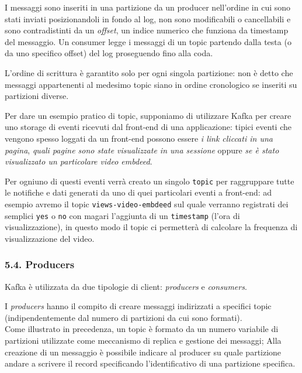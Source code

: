 \documentclass[]{article}
\begin{document}
I messaggi sono inseriti in una partizione da un producer nell'ordine in
cui sono stati inviati posizionandoli in fondo al log, non sono
modificabili o cancellabili e sono contradistinti da un \emph{offset},
un indice numerico che funziona da timestamp del messaggio. Un consumer
legge i messaggi di un topic partendo dalla testa (o da uno specifico
offset) del log proseguendo fino alla coda.

L'ordine di scrittura è garantito solo per ogni singola partizione: non
è detto che messaggi appartenenti al medesimo topic siano in ordine
cronologico se inseriti su partizioni diverse.

Per dare un esempio pratico di topic, supponiamo di utilizzare Kafka per
creare uno storage di eventi ricevuti dal front-end di una applicazione:
tipici eventi che vengono spesso loggati da un front-end possono essere
\emph{i link cliccati in una pagina}, \emph{quali pagine sono state
visualizzate in una sessione} oppure \emph{se è stato visualizzato un
particolare video embdeed}.

Per ogniuno di questi eventi verrà creato un singolo \texttt{topic} per
raggruppare tutte le notifiche e dati generati da uno di quei
particolari eventi a front-end: ad esempio avremo il topic
\texttt{views-video-embdeed} sul quale verranno registrati dei semplici
\texttt{yes} o \texttt{no} con magari l'aggiunta di un
\texttt{timestamp} (l'ora di visualizzazione), in questo modo il topic
ci permetterà di calcolare la frequenza di visualizzazione del video.

\newpage

\subsubsection{5.4. Producers}\label{producers}

Kafka è utilizzata da due tipologie di client: \emph{producers} e
\emph{consumers}.

I \emph{producers} hanno il compito di creare messaggi indirizzati a
specifici topic (indipendentemente dal numero di partizioni da cui sono
formati).\\
Come illustrato in precedenza, un topic è formato da un numero variabile
di partizioni utilizzate come meccanismo di replica e gestione dei
messaggi; Alla creazione di un messaggio è possibile indicare al
producer su quale partizione andare a scrivere il record specificando
l'identificativo di una partizione specifica.
\end{document}
